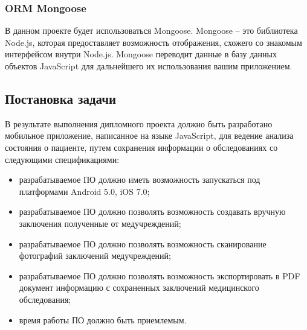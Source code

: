 \subsubsection{ORM Mongoose}

В данном проекте будет использоваться Mongoose. Mongoose -- это библиотека Node.js, которая предоставляет возможность отображения, схожего со знакомым интерфейсом внутри Node.js. Mongoose переводит данные в базу данных объектов JavaScript для дальнейшего их использования вашим приложением.

\subsection{Постановка задачи}
\label{sub:domain:task}
В результате выполнения дипломного проекта должно быть разработано мобильное приложение, написанное на языке JavaScript, для ведение анализа состояния о пациенте, путем сохранения информации о обследованиях со следующими спецификациями:
\begin{itemize}
  \item разрабатываемое ПО должно иметь возможность запускаться под платформами Android 5.0, iOS 7.0;
  \item разрабатываемое ПО должно позволять возможность создавать вручную заключения полученные от медучреждений;
  \item разрабатываемое ПО должно позволять возможность сканирование фотографий заключений медучреждений;
  \item разрабатываемое ПО должно позволять возможность экспортировать в PDF документ информацию с сохраненных заключений медицинского обследования;
  \item время работы ПО должно быть приемлемым.
\end{itemize}